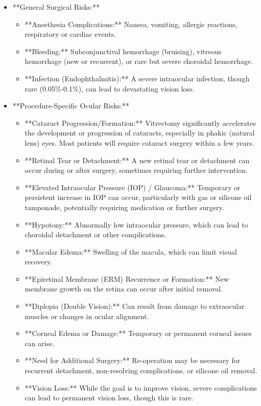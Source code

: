 \begin{itemize}
  \item **General Surgical Risks:**
  
  \begin{itemize}
    \item **Anesthesia Complications:** Nausea, vomiting, allergic reactions, respiratory or cardiac events.
    \item **Bleeding:** Subconjunctival hemorrhage (bruising), vitreous hemorrhage (new or recurrent), or rare but severe choroidal hemorrhage.
    \item **Infection (Endophthalmitis):** A severe intraocular infection, though rare (0.05\%-0.1\%), can lead to devastating vision loss.
  \end{itemize}
  
  \item **Procedure-Specific Ocular Risks:**
  
  \begin{itemize}
    \item **Cataract Progression/Formation:** Vitrectomy significantly accelerates the development or progression of cataracts, especially in phakic (natural lens) eyes. Most patients will require cataract surgery within a few years.
    \item **Retinal Tear or Detachment:** A new retinal tear or detachment can occur during or after surgery, sometimes requiring further intervention.
    \item **Elevated Intraocular Pressure (IOP) / Glaucoma:** Temporary or persistent increase in IOP can occur, particularly with gas or silicone oil tamponade, potentially requiring medication or further surgery.
    \item **Hypotony:** Abnormally low intraocular pressure, which can lead to choroidal detachment or other complications.
    \item **Macular Edema:** Swelling of the macula, which can limit visual recovery.
    \item **Epiretinal Membrane (ERM) Recurrence or Formation:** New membrane growth on the retina can occur after initial removal.
    \item **Diplopia (Double Vision):** Can result from damage to extraocular muscles or changes in ocular alignment.
    \item **Corneal Edema or Damage:** Temporary or permanent corneal issues can arise.
    \item **Need for Additional Surgery:** Re-operation may be necessary for recurrent detachment, non-resolving complications, or silicone oil removal.
    \item **Vision Loss:** While the goal is to improve vision, severe complications can lead to permanent vision loss, though this is rare.
  \end{itemize}
\end{itemize}


